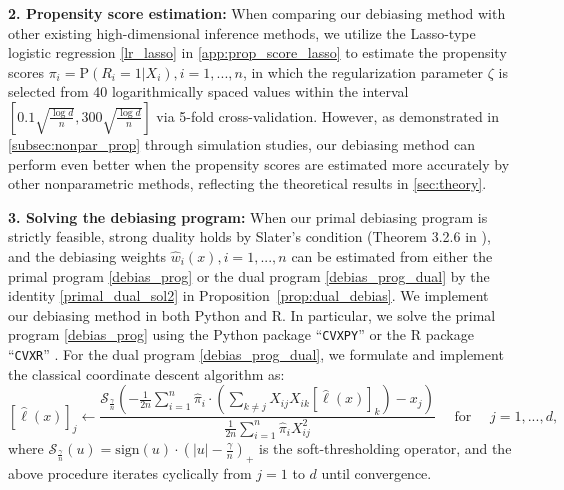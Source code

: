 \documentclass[ejsv2,noshowframe]{imsart}
\theoremstyle{plain}
\theoremstyle{definition}
\theoremstyle{remark}
\renewcommand{\hat}{\widehat}
\begin{document}
{\bf 2. Propensity score estimation:} When comparing our debiasing method with other existing high-dimensional inference methods, we utilize the Lasso-type logistic regression \eqref{lr_lasso} in \autoref{app:prop_score_lasso} to estimate the propensity scores $\pi_i=\mathrm{P}(R_i=1|X_i), i=1,...,n$, in which the regularization parameter $\zeta$ is selected from 40 logarithmically spaced values within the interval $\left[0.1\sqrt{\frac{\log d}{n}}, 300\sqrt{\frac{\log d}{n}}\right]$ via 5-fold cross-validation. However, as demonstrated in \autoref{subsec:nonpar_prop} through simulation studies, our debiasing method can perform even better when the propensity scores are estimated more accurately by other nonparametric methods, reflecting the theoretical results in \autoref{sec:theory}.

{\bf 3. Solving the debiasing program:} 
When our primal debiasing program is strictly feasible, strong duality holds by Slater's condition (Theorem 3.2.6 in \citealt{Renegar2001Amvo}), and the debiasing weights $\hat{w}_i(x), i=1,...,n$ can be estimated from either the primal program \eqref{debias_prog} or the dual program \eqref{debias_prog_dual} by the identity \eqref{primal_dual_sol2} in Proposition~\ref{prop:dual_debias}. We implement our debiasing method in both Python and R. In particular, we solve the primal program \eqref{debias_prog} using the Python package ``\texttt{CVXPY}'' \citep{diamond2016cvxpy,agrawal2018rewriting} or the R package ``\texttt{CVXR}'' \citep{cvxr2020}. For the dual program \eqref{debias_prog_dual}, we formulate and implement the classical coordinate descent algorithm \citep{wright2015coordinate} as:
\begin{equation}
	\label{coord_desc}
		\left[\hat{\ell}(x)\right]_j \gets \frac{\mathcal{S}_{\frac{\gamma}{n}}\left(-\frac{1}{2n} \sum_{i=1}^n \hat{\pi}_i\cdot \left(\sum_{k\neq j} X_{ij} X_{ik} \left[\hat{\ell}(x)\right]_k\right) -x_j\right)}{\frac{1}{2n} \sum_{i=1}^n \hat{\pi}_i X_{ij}^2} \quad \text{ for } \quad j=1,...,d,
\end{equation}
where $\mathcal{S}_{\frac{\gamma}{n}}(u) = \mathrm{sign}(u)\cdot \left(|u|-\frac{\gamma}{n}\right)_+$ is the soft-thresholding operator, and the above procedure iterates cyclically from $j=1$ to $d$ until convergence. 
\end{document}
